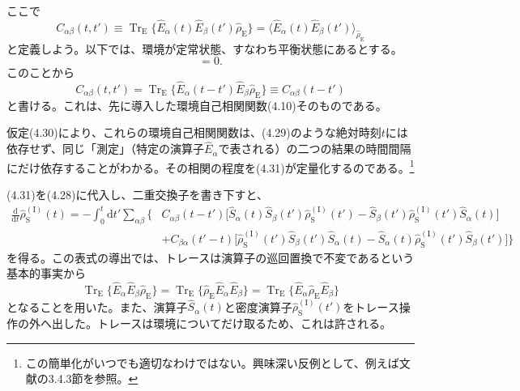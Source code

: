 \hypertarget{srcpage:162}{}\label{srcpage:162}
ここで
\begin{equation}
C_{\alpha\beta}(t,t')\equiv\operatorname{Tr}_{\mathrm E}\{\hat E_\alpha(t)\hat E_\beta(t')\hat\rho_{\mathrm E}\}
=\langle\hat E_\alpha(t)\hat E_\beta(t')\rangle_{\hat\rho_{\mathrm E}}
\tag{4.29}
\end{equation}
と定義しよう。以下では、環境が定常状態、すなわち平衡状態にあるとする。
\begin{equation}
[\hat H_{\mathrm E},\hat\rho_{\mathrm E}]=0.
\tag{4.30}
\end{equation}
このことから
\begin{equation}
C_{\alpha\beta}(t,t')=\operatorname{Tr}_{\mathrm E}\{\hat E_\alpha(t-t')\hat E_\beta\hat\rho_{\mathrm E}\}
\equiv C_{\alpha\beta}(t-t')
\tag{4.31}
\end{equation}
と書ける。これは、先に導入した環境自己相関関数(4.10)そのものである。

仮定(4.30)により、これらの環境自己相関関数は、(4.29)のような絶対時刻$t$には依存せず、同じ「測定」（特定の演算子$\hat E_\alpha$で表される）の二つの結果の時間間隔にだけ依存することがわかる。その相関の程度を(4.31)が定量化するのである。\footnote{この簡単化がいつでも適切なわけではない。興味深い反例として、例えば文献\cite{ref018}の3.4.3節を参照。}

(4.31)を(4.28)に代入し、二重交換子を書き下すと、
\begin{equation}
\begin{aligned}
\frac{\mathrm d}{\mathrm dt}\hat\rho^{(\mathrm I)}_{\mathrm S}(t)
=-\int_0^t\mathrm dt'\sum_{\alpha\beta}\Big\{&C_{\alpha\beta}(t-t')
\big[\hat S_\alpha(t)\hat S_\beta(t')\hat\rho^{(\mathrm I)}_{\mathrm S}(t')
-\hat S_\beta(t')\hat\rho^{(\mathrm I)}_{\mathrm S}(t')\hat S_\alpha(t)\big]\\
&+C_{\beta\alpha}(t'-t)
\big[\hat\rho^{(\mathrm I)}_{\mathrm S}(t')\hat S_\beta(t')\hat S_\alpha(t)
-\hat S_\alpha(t)\hat\rho^{(\mathrm I)}_{\mathrm S}(t')\hat S_\beta(t')\big]\Big\}
\end{aligned}\tag{4.32}
\end{equation}
を得る。この表式の導出では、トレースは演算子の巡回置換で不変であるという基本的事実から
\begin{equation}
\operatorname{Tr}_{\mathrm E}\{\hat E_\alpha\hat E_\beta\hat\rho_{\mathrm E}\}
=\operatorname{Tr}_{\mathrm E}\{\hat\rho_{\mathrm E}\hat E_\alpha\hat E_\beta\}
=\operatorname{Tr}_{\mathrm E}\{\hat E_\alpha\hat\rho_{\mathrm E}\hat E_\beta\}
\tag{4.33}
\end{equation}
となることを用いた。また、演算子$\hat S_\alpha(t)$と密度演算子$\hat\rho^{(\mathrm I)}_{\mathrm S}(t')$をトレース操作の外へ出した。トレースは環境についてだけ取るため、これは許される。

